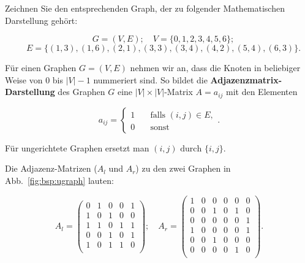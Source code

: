 \begin{aufg}
Zeichnen Sie den entsprechenden Graph, der zu folgender Mathematischen Darstellung gehört:

\[ \quad G = (V, E); \quad V = \{0,1,2,3,4,5,6\}; \] 
\[\quad E =  \{ (1,3),(1,6), (2,1), (3,3), (3,4), (4,2), (5,4), (6,3)\}. \]

\end{aufg}


\begin{mdef}
Für einen Graphen $G=(V,E)$ nehmen wir an, dass die Knoten in beliebiger Weise von 0 bis $|V|-1$ nummeriert sind.
So bildet die \textbf{Adjazenzmatrix-Darstellung} des Graphen $G$ eine $|V| \times |V|$-Matrix $A=a_{ij}$ mit den Elementen

\[ a_{ij} = 
  \begin{cases}
    1   & \quad \text{falls } (i,j) \in E, \\
   0   & \quad \text{sonst}
  \end{cases}.
\]

Für ungerichtete Graphen ersetzt man $(i,j) \text{ durch } \{i,j\}$.
\end{mdef}

\begin{mbsp}
Die Adjazenz-Matrizen ($A_l$ und $A_r$) zu den zwei Graphen in Abb.~\ref{fig:bsp:ugraph} lauten:

\[ A_l =  \begin{pmatrix}
  0 & 1 & 0 & 0 & 1 \\
  1 & 0 & 1 & 0 & 0 \\
  1 & 1 & 0 & 1 & 1  \\
  0 & 0 & 1 & 0 & 1 \\
  1 & 0 & 1 & 1 & 0 \\
 \end{pmatrix};
\quad
A_r =  \begin{pmatrix}
  1 & 0 & 0 & 0 & 0 & 0 \\
  0 & 0 & 1 & 0 & 1 & 0 \\
  0 & 0 & 0 & 0 & 0 & 1 \\
  1 & 0 & 0 & 0 & 0 & 1 \\
  0 & 0 & 1 & 0 & 0 & 0 \\
  0 & 0 & 0 & 0 & 1 & 0 \\
 \end{pmatrix}.
  \]
\end{mbsp}

